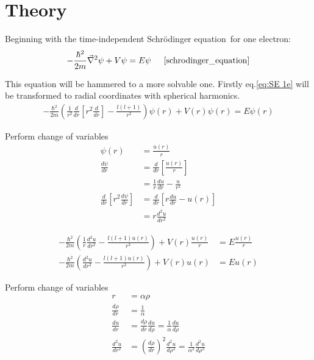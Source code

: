 \documentclass[11pt,a4paper,notitlepage]{article}
\newcommand{\SE}{Schr\"odinger equation}
\newcommand{\laplacian}{\vec{\nabla}^2}
\begin{document}
\section{Theory}
Beginning with the time-independent \SE\  for one electron:
\begin{equation} \label{eq:SE 1e}
	-\frac{\hbar^2}{2m}\laplacian \psi + V\psi = E\psi 			
	\indent
	\cite[chapter 4, p.132, eq:4.8]{schrodinger_equation}
\end{equation}

This equation will be hammered to a more solvable one. Firstly eq.\eqref{eq:SE 1e} will be transformed to radial coordinates with spherical harmonics.
\begin{align*}
	-\frac{\hbar^2}{2m}\left( \frac{1}{r^2} \frac{d}{dr}\left [ r^2\frac{d}{dr}\right ] - \frac{l(l+1)}{r^2}\right) \psi(r) + V(r)\psi(r) = E\psi(r)
\end{align*}

\begin{flushright}
\begin{minipage}{0.5\linewidth}
	Perform change of variables 
	\begin{align*}
		\psi(r) &= \frac{u(r)}{r} \\
		\frac{d\psi}{dr} &= \frac{d}{dr}\left[\frac{u(r)}{r}\right] \\
		&= \frac{1}{r}\frac{du}{dr} - \frac{u}{r^2} \\
		\frac{d}{dr}\left[ r^2 \frac{d\psi}{dr} \right] 
		&= \frac{d}{dr}\left[ r\frac{du}{dr} - u(r) \right] \\
		&= r\frac{d^2u}{dr^2}
	\end{align*}
\end{minipage}
\end{flushright}

\begin{align*}
	-\frac{\hbar^2}{2m}\left( \frac{1}{r} \frac{d^2u}{dr^2} - \frac{l(l+1)u(r)}{r^3}\right) + V(r)\frac{u(r)}{r} &= E\frac{u(r)}{r} \\
	-\frac{\hbar^2}{2m}\left( \frac{d^2u}{dr^2} - \frac{l(l+1)u(r)}{r^2}\right) + V(r)u(r) &= Eu(r)
\end{align*}

\begin{flushright}
\begin{minipage}{0.5\linewidth}
	Perform change of variables 
	\begin{align*}
		r &= \alpha \rho \\
		\frac{d\rho}{dr} &= \frac{1}{\alpha} \\
		\frac{du}{dr} &= \frac{d\rho}{dr}\frac{du}{d\rho} = \frac{1}{\alpha}\frac{du}{d\rho} \\
		\frac{d^2u}{dr^2} &= \left(\frac{d\rho}{dr}\right)^2 \frac{d^2u}{d\rho^2} = \frac{1}{\alpha^2} \frac{d^2u}{d\rho^2}
	\end{align*}
\end{minipage}
\end{flushright}
\end{document}
